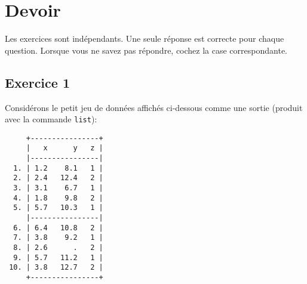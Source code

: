 \chapter*{Devoir }

Les exercices sont indépendants. Une seule réponse est correcte pour chaque
question. Lorsque vous ne savez pas répondre, cochez la case correspondante.

\section*{Exercice 1}
Considérons le petit jeu de données affichés ci-dessous comme une sortie
\Stata (produit avec la commande \verb|list|):
\begin{verbatim}
     +----------------+
     |   x      y   z |
     |----------------|
  1. | 1.2    8.1   1 |
  2. | 2.4   12.4   2 |
  3. | 3.1    6.7   1 |
  4. | 1.8    9.8   2 |
  5. | 5.7   10.3   1 |
     |----------------|
  6. | 6.4   10.8   2 |
  7. | 3.8    9.2   1 |
  8. | 2.6      .   2 |
  9. | 5.7   11.2   1 |
 10. | 3.8   12.7   2 |
     +----------------+
\end{verbatim}
